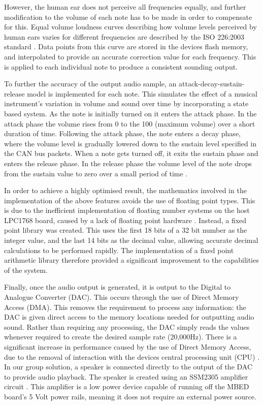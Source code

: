 However, the human ear does not perceive all frequencies equally, and further 
modification to the volume of each note has to be made in order to compensate 
for this. Equal volume loudness curves describing how volume levels perceived by 
human ears varies for different frequencies are described 
by the ISO 226:2003 standard \cite{iso-226}. 
Data points from this curve are stored in the devices flash memory, and 
interpolated to provide an accurate correction value for each frequency. This is 
applied to each individual note to produce a consistent sounding output. 
\par\bigskip\noindent
To further the accuracy of the output audio sample, an attack-decay-sustain-release 
model is implemented for each note. This simulates the effect of a musical 
instrument's variation in volume and sound over time by incorporating a state 
based system. As the note is initially turned on it enters the attack phase. 
In the attack phase the volume rises from 0 to the 100 (maximum volume) over a 
short duration of time.
Following the attack phase, the note enters a decay phase, where the volume level 
is gradually lowered down to the sustain level specified in the CAN bus packets. 
When a note gets turned off, it exits the sustain phase and enters the release phase. 
In the release phase the volume level of the note drops from the sustain value to 
zero over a small period of time \cite{asr-book}. 
\par\bigskip\noindent
In order to achieve a highly optimised result, the mathematics involved in the 
implementation of the above features avoids the use of floating point types. 
This is due to the inefficient implementation of floating number systems on the 
host LPC1768 board, caused by a lack of floating point hardware 
\cite{kormanyos2013real, lpc1768-datasheet}.
Instead, a fixed point library was created. This uses the first 18 bits of a 
32 bit number as the integer value, and the last 14 bits as the decimal value, 
allowing accurate decimal calculations to be performed rapidly. 
The implementation of a fixed point arithmetic library therefore provided a 
significant improvement to the capabilities of the system. 
\par\bigskip\noindent
Finally, once the audio output is generated, it is output to the Digital to 
Analogue Converter (DAC). This occurs through the use of Direct Memory Access (DMA).
This removes the requirement to process any information: the DAC is given 
direct access to the memory locations needed for outputting audio sound. Rather 
than requiring any processing, the DAC simply reads the values whenever required 
to create the desired sample rate (20,000Hz).
There is a significant increase in performance caused by the use of Direct Memory 
Access, due to the removal of interaction with the devices central processing unit
(CPU) \cite{barr1999programming}. 
In our group solution, a speaker is connected directly to the output of the DAC 
to provide audio playback. 
The speaker is created using an SSM2305 amplifier circuit \cite{speaker}. This 
amplifier is a low power device capable of running off the MBED board's 
5 Volt power rails, meaning it does not require an external power source. 

